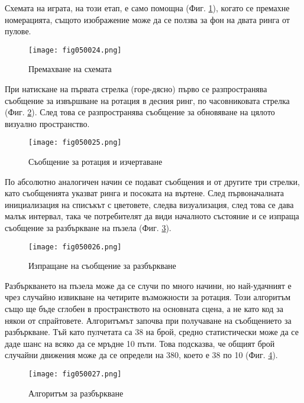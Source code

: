 Схемата на играта, на този етап, е само помощна (Фиг. \ref{fig050024}), когато се премахне номерацията, същото изображение може да се ползва за фон на двата ринга от пулове.

\begin{figure}[H]
  \centering
  \texttt{[image: fig050024.png]}
  \caption{Премахване на схемата}
\label{fig050024}
\end{figure}

При натискане на първата стрелка (горе-дясно) първо се разпространява съобщение за извършване на ротация в десния ринг, по часовниковата стрелка (Фиг. \ref{fig050025}). След това се разпространява съобщение за обновяване на цялото визуално пространство.

\begin{figure}[H]
  \centering
  \texttt{[image: fig050025.png]}
  \caption{Съобщение за ротация и изчертаване}
\label{fig050025}
\end{figure}

По абсолютно аналогичен начин се подават съобщения и от другите три стрелки, като съобщенията указват ринга и посоката на въртене. След първоначалната инициализация на списъкът с цветовете, следва визуализация, след това се дава малък интервал, така че потребителят да види началното състояние и се изпраща съобщение за разбъркване на пъзела (Фиг. \ref{fig050026}).

\begin{figure}[H]
  \centering
  \texttt{[image: fig050026.png]}
  \caption{Изпращане на съобщение за разбъркване}
\label{fig050026}
\end{figure}

Разбъркването на пъзела може да се случи по много начини, но най-удачният е чрез случайно извикване на четирите възможности за ротация. Този алгоритъм също ще бъде сглобен в пространството на основната сцена, а не като код за някои от спрайтовете. Алгоритъмът започва при получаване на съобщението за разбъркване. Тъй като пулчетата са 38 на брой, средно статистически може да се даде шанс на всяко да се мръдне 10 пъти. Това подсказва, че общият брой случайни движения може да се определи на 380, което е 38 по 10 (Фиг. \ref{fig050027}).

\begin{figure}[H]
  \centering
  \texttt{[image: fig050027.png]}
  \caption{Алгоритъм за разбъркване}
\label{fig050027}
\end{figure}

